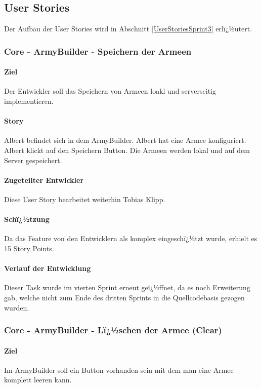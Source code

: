 \documentclass[12pt, titlepage]{scrartcl}
\begin{document}
		\subsection{User Stories}
			Der Aufbau der User Stories wird in Abschnitt \ref{UserStoriesSprint3} erlï¿½utert.
			
			\subsubsection{Core - ArmyBuilder - Speichern der Armeen}
			\paragraph{Ziel} Der Entwickler soll das Speichern von Armeen loakl und serverseitig implementieren.
			\paragraph{Story} Albert befindet sich in dem ArmyBuilder. Albert hat eine Armee konfiguriert. Albert klickt auf den Speichern Button. Die Armeen werden lokal und auf dem Server gespeichert.
			\paragraph{Zugeteilter Entwickler} Diese User Story bearbeitet weiterhin Tobias Klipp.
			\paragraph{Schï¿½tzung}
			Da das Feature von den Entwicklern als komplex eingeschï¿½tzt wurde, erhielt es 15 Story Points.
			\paragraph{Verlauf der Entwicklung} Dieser Task wurde im vierten Sprint erneut geï¿½ffnet, da es noch Erweiterung gab, welche nicht zum Ende des dritten Sprints in die Quellcodebasis gezogen wurden.
			
			\subsubsection{Core - ArmyBuilder - Lï¿½schen der Armee (Clear)}
			\paragraph{Ziel} Im ArmyBuilder soll ein Button vorhanden sein mit dem man eine Armee komplett leeren kann.
\end{document}
